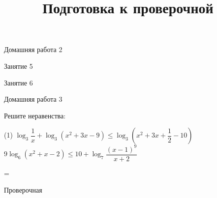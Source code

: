 \begin{homework}[number=2]
	\begin{listofex}
		\item Домашняя работа 2
	\end{listofex}
\end{homework}

\begin{class}[number=5]
	\begin{listofex}
		\item Занятие 5
	\end{listofex}
\end{class}

\begin{class}[number=6]
	\begin{listofex}
		\item Занятие 6
	\end{listofex}
\end{class}

\begin{homework}[number=3]
	\begin{listofex}
		\item Домашняя работа 3
	\end{listofex}
\end{homework}

\begin{class}[number=7]
	\title{Подготовка к проверочной}
	\begin{listofex}
		\item Решите неравенства:
	\begin{tasks}(1)
		\task \( \log_3 \dfrac{1}{x} + \log_3 (x^2+3x-9) \le \log_3 \left( x^2+3x+\dfrac{1}{2}-10 \right)  \)
		\task \( 9\log_6 (x^2+x-2) \le 10 + \log_7 \dfrac{(x-1)^9}{x+2} \)
	\end{tasks}
	\end{listofex}
\end{class}

=%
\begin{exam}
	\begin{listofex}
		\item Проверочная
	\end{listofex}
\end{exam}
